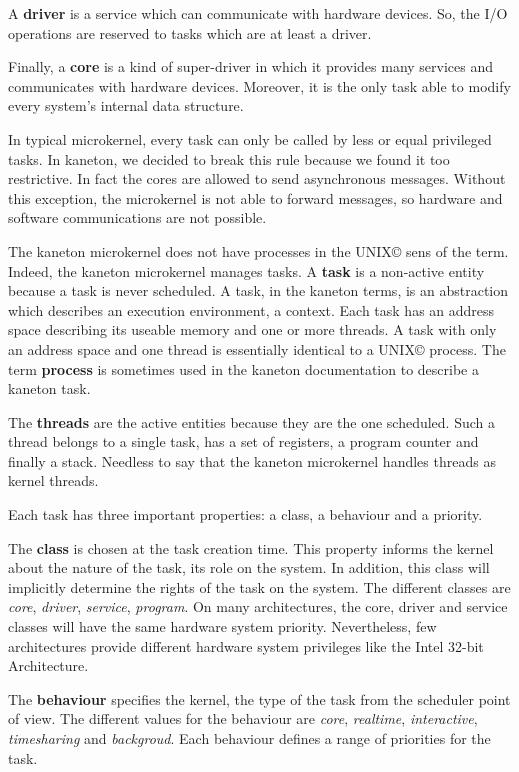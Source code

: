 {\begin{multicols}{2}
A \textbf{driver} is a service which can communicate with hardware devices.
So, the I/O operations are reserved to tasks which are at least a driver.

Finally, a \textbf{core} is a kind of super-driver in which it provides
many services and communicates with hardware devices. Moreover, it is
the only task able to modify every system's internal data structure.

In typical microkernel, every task can only be called by less or equal
privileged tasks. In kaneton, we decided to break this rule because we found
it too restrictive. In fact the cores are allowed to send asynchronous
messages. Without this exception, the microkernel is not able to forward
messages, so hardware and software communications are not possible.

The kaneton microkernel does not have processes in the
UNIX{\scriptsize \copyright} sens of the term. Indeed, the kaneton
microkernel manages tasks. A \textbf{task} is a non-active entity because
a task is never scheduled. A task, in the kaneton terms, is an abstraction
which describes an execution environment, a context. Each task has an
address space describing its useable memory and one or more threads.
A task with only an address space and one thread is essentially identical
to a UNIX{\scriptsize \copyright} process. The term \textbf{process} is
sometimes used in the kaneton documentation to describe a kaneton task.

The \textbf{threads} are the active entities because they are the one
scheduled. Such a thread belongs to a single task, has a set of registers,
a program counter and finally a stack. Needless to say that the kaneton
microkernel handles threads as kernel threads.

Each task has three important properties: a class, a behaviour and a priority.

The \textbf{class} is chosen at the task creation time. This property
informs the kernel about the nature of the task, its role on the system.
In addition, this class will implicitly determine the rights of the task
on the system. The different classes are \textit{core}, \textit{driver},
\textit{service}, \textit{program}. On many architectures, the core, driver
and service classes will have the same hardware system priority.
Nevertheless, few architectures provide different hardware system privileges
like the Intel 32-bit Architecture.

The \textbf{behaviour} specifies the kernel, the type of the task from the
scheduler point of view. The different values for the behaviour are
\textit{core}, \textit{realtime}, \textit{interactive}, \textit{timesharing}
and \textit{backgroud}. Each behaviour defines a range of priorities for the
task.


\end{multicols}}
